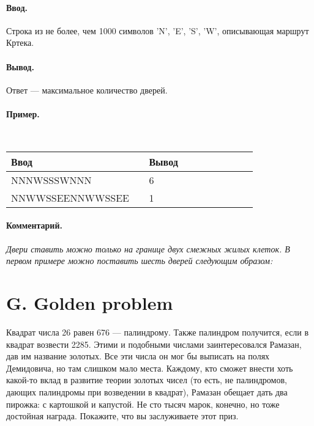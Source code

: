 \documentclass[12pt, a5paper]{article}
\newcommand{\informat}[1]
{
	\paragraph{Ввод.\\} #1
}
\newcommand{\outformat}[1]
{
	\paragraph{Вывод.\\} #1
}
\newcommand{\examplee}[4]
{
	\paragraph{Пример.\\}
	{\tt
	\begin{tabular}{|p{0.4\linewidth}|p{0.4\linewidth}|}
	\hline
	Ввод 	& Вывод  	\\
	\hline
	#1 		& #2 		\\
	\hline
	#3		& #4		\\
	\hline
	\end{tabular}
	}
}
\newcommand{\excomm}[1]
{
	\paragraph{Комментарий. \\}
	\textit{#1}
}
\begin{document}
\informat{Строка из не более, чем 1000 символов 'N', 'E', 'S', 'W', описывающая маршрут Кртека.}

\outformat{Ответ --- максимальное количество дверей.}

\examplee{NNNWSSSWNNN}{6}
{NNWWSSEENNWWSSEE}{1}

\excomm{Двери ставить можно только на границе двух смежных жилых клеток. В первом примере можно поставить шесть дверей следующим образом: }

\begin{center}
\end{center}




\section*{G. Golden problem}


Квадрат числа 26 равен 676 --- палиндрому. Также палиндром получится, если в квадрат возвести 2285. Этими и подобными числами заинтересовался Рамазан, дав им название золотых. Все эти числа он мог бы выписать на полях Демидовича, но там слишком мало места. Каждому, кто сможет внести хоть какой-то вклад в развитие теории золотых чисел (то есть, не палиндромов, дающих палиндромы при возведении в квадрат), Рамазан обещает дать два пирожка: с картошкой и капустой. Не сто тысяч марок, конечно, но тоже до\-стой\-ная награда. Покажите, что вы заслуживаете этот приз.
\end{document}
